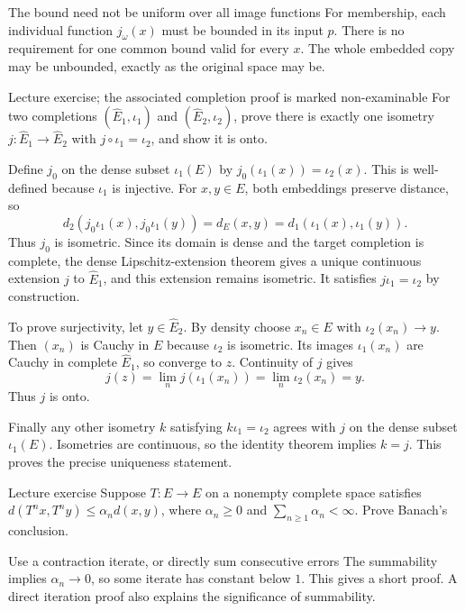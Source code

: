 \begin{note}{The bound need not be uniform over all image functions}
For membership, each individual function $j_\omega(x)$ must be bounded in its input $p$. There is no requirement for one common bound valid for every $x$. The whole embedded copy may be unbounded, exactly as the original space may be.
\end{note}
\begin{exam}{Lecture exercise; the associated completion proof is marked non-examinable}
For two completions $(\widehat E_1,\iota_1)$ and $(\widehat E_2,\iota_2)$, prove there is exactly one isometry $j:\widehat E_1\to\widehat E_2$ with $j\circ\iota_1=\iota_2$, and show it is onto.
\end{exam}
\begin{answer}
Define $j_0$ on the dense subset $\iota_1(E)$ by $j_0(\iota_1(x))=\iota_2(x)$. This is well-defined because $\iota_1$ is injective. For $x,y\in E$, both embeddings preserve distance, so
\[d_2(j_0\iota_1(x),j_0\iota_1(y))=d_E(x,y)=d_1(\iota_1(x),\iota_1(y)).\]
Thus $j_0$ is isometric. Since its domain is dense and the target completion is complete, the dense Lipschitz-extension theorem gives a unique continuous extension $j$ to $\widehat E_1$, and this extension remains isometric. It satisfies $j\iota_1=\iota_2$ by construction.

To prove surjectivity, let $y\in\widehat E_2$. By density choose $x_n\in E$ with $\iota_2(x_n)\to y$. Then $(x_n)$ is Cauchy in $E$ because $\iota_2$ is isometric. Its images $\iota_1(x_n)$ are Cauchy in complete $\widehat E_1$, so converge to $z$. Continuity of $j$ gives
\[j(z)=\lim_nj(\iota_1(x_n))=\lim_n\iota_2(x_n)=y.\]
Thus $j$ is onto.

Finally any other isometry $k$ satisfying $k\iota_1=\iota_2$ agrees with $j$ on the dense subset $\iota_1(E)$. Isometries are continuous, so the identity theorem implies $k=j$. This proves the precise uniqueness statement.
\end{answer}
\begin{exam}{Lecture exercise}
Suppose $T:E\to E$ on a nonempty complete space satisfies $d(T^nx,T^ny)\le\alpha_nd(x,y)$, where $\alpha_n\ge0$ and $\sum_{n\ge1}\alpha_n<\infty$. Prove Banach's conclusion.
\end{exam}
\begin{method}{Use a contraction iterate, or directly sum consecutive errors}
The summability implies $\alpha_n\to0$, so some iterate has constant below $1$. This gives a short proof. A direct iteration proof also explains the significance of summability.
\end{method}
